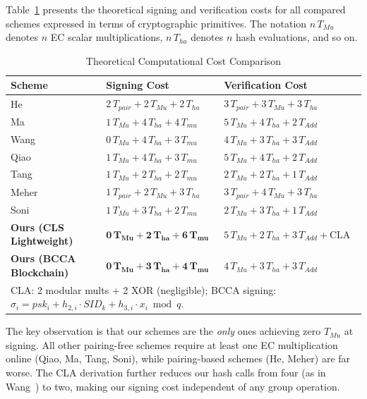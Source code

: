 \documentclass[conference]{IEEEtran}
\begin{document}
Table~\ref{tab:theory} presents the theoretical signing and verification
costs for all compared schemes expressed in terms of cryptographic
primitives. The notation $n\,T_{Mu}$ denotes $n$ EC scalar multiplications,
$n\,T_{ha}$ denotes $n$ hash evaluations, and so on.

\begin{table}[htbp]
\centering
\caption{Theoretical Computational Cost Comparison}
\label{tab:theory}
\renewcommand{\arraystretch}{1.2}
\setlength{\tabcolsep}{4pt}
\begin{tabular}{lll}
\toprule
\textbf{Scheme} & \textbf{Signing Cost} & \textbf{Verification Cost} \\
\midrule
He~\cite{ref27}    & $2\,T_{pair}+2\,T_{Mu}+2\,T_{ha}$ & $3\,T_{pair}+3\,T_{Mu}+3\,T_{ha}$ \\
Ma~\cite{ref22}    & $1\,T_{Mu}+4\,T_{ha}+4\,T_{mu}$ & $5\,T_{Mu}+4\,T_{ha}+2\,T_{Add}$ \\
Wang~\cite{ref1}   & $0\,T_{Mu}+4\,T_{ha}+3\,T_{mu}$ & $4\,T_{Mu}+3\,T_{ha}+3\,T_{Add}$ \\
Qiao~\cite{ref24}  & $1\,T_{Mu}+4\,T_{ha}+3\,T_{mu}$ & $5\,T_{Mu}+4\,T_{ha}+2\,T_{Add}$ \\
Tang~\cite{ref25}  & $1\,T_{Mu}+2\,T_{ha}+2\,T_{mu}$ & $2\,T_{Mu}+2\,T_{ha}+1\,T_{Add}$ \\
Meher~\cite{ref28} & $1\,T_{pair}+2\,T_{Mu}+3\,T_{ha}$ & $3\,T_{pair}+4\,T_{Mu}+3\,T_{ha}$ \\
Soni~\cite{ref26}  & $1\,T_{Mu}+3\,T_{ha}+2\,T_{mu}$ & $2\,T_{Mu}+3\,T_{ha}+1\,T_{Add}$ \\
\midrule
\textbf{Ours (CLS Lightweight)} & $\mathbf{0\,T_{Mu}+2\,T_{ha}+6\,T_{mu}}$ & $5\,T_{Mu}+2\,T_{ha}+3\,T_{Add}+\text{CLA}$ \\
\textbf{Ours (BCCA Blockchain)} & $\mathbf{0\,T_{Mu}+3\,T_{ha}+4\,T_{mu}}$ & $4\,T_{Mu}+3\,T_{ha}+3\,T_{Add}$ \\
\bottomrule
\multicolumn{3}{l}{\small CLA: 2 modular mults + 2 XOR (negligible); BCCA signing: $\sigma_i = psk_i + h_{2,i}\cdot SID_k + h_{3,i}\cdot x_i \bmod q$.}
\end{tabular}
\end{table}

The key observation is that our schemes are the \textit{only} ones achieving
zero $T_{Mu}$ at signing. All other pairing-free schemes require at least one
EC multiplication online (Qiao, Ma, Tang, Soni), while pairing-based schemes
(He, Meher) are far worse. The CLA derivation further reduces our hash calls
from four (as in Wang~\cite{ref1}) to two, making our signing cost independent
of any group operation.
\end{document}
